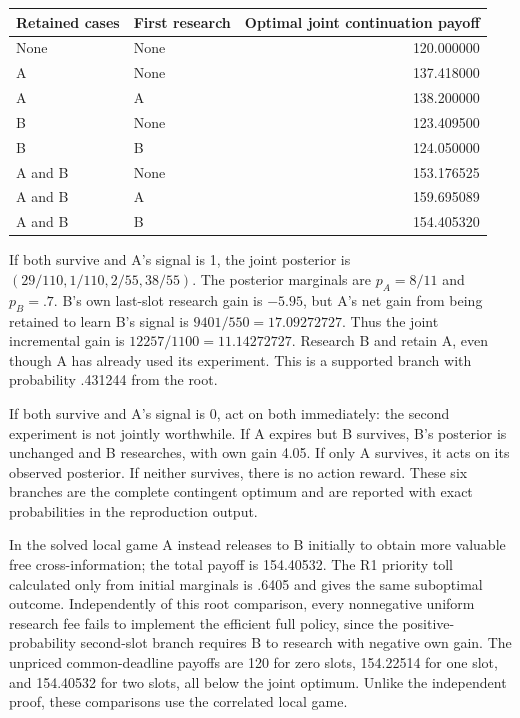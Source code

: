 \documentclass[
  11pt,
]{article}
\begin{document}
\begin{longtable}[]{@{}llr@{}}
\toprule\noalign{}
Retained cases & First research & Optimal joint continuation payoff \\
\midrule\noalign{}
\endhead
\bottomrule\noalign{}
\endlastfoot
None & None & 120.000000 \\
A & None & 137.418000 \\
A & A & 138.200000 \\
B & None & 123.409500 \\
B & B & 124.050000 \\
A and B & None & 153.176525 \\
A and B & A & 159.695089 \\
A and B & B & 154.405320 \\
\end{longtable}

If both survive and A's signal is 1, the joint posterior is
\((29/110,1/110,2/55,38/55)\). The posterior marginals are \(p_A=8/11\)
and \(p_B=.7\). B's own last-slot research gain is \(-5.95\), but A's
net gain from being retained to learn B's signal is
\(9401/550=17.09272727\). Thus the joint incremental gain is
\(12257/1100=11.14272727\). Research B and retain A, even though A has
already used its experiment. This is a supported branch with probability
.431244 from the root.

If both survive and A's signal is 0, act on both immediately: the second
experiment is not jointly worthwhile. If A expires but B survives, B's
posterior is unchanged and B researches, with own gain 4.05. If only A
survives, it acts on its observed posterior. If neither survives, there
is no action reward. These six branches are the complete contingent
optimum and are reported with exact probabilities in the reproduction
output.

In the solved local game A instead releases to B initially to obtain
more valuable free cross-information; the total payoff is 154.40532. The
R1 priority toll calculated only from initial marginals is .6405 and
gives the same suboptimal outcome. Independently of this root
comparison, every nonnegative uniform research fee fails to implement
the efficient full policy, since the positive-probability second-slot
branch requires B to research with negative own gain. The unpriced
common-deadline payoffs are 120 for zero slots, 154.22514 for one slot,
and 154.40532 for two slots, all below the joint optimum. Unlike the
independent proof, these comparisons use the correlated local game.
\end{document}

